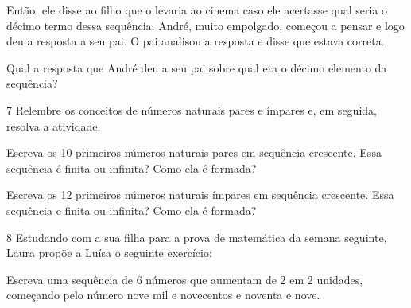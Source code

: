 Então, ele disse ao filho que o levaria ao cinema caso ele acertasse
qual seria o décimo termo dessa sequência. André, muito empolgado, começou a
pensar e logo deu a resposta a seu pai. O pai analisou a resposta e
disse que estava correta.

Qual a resposta que André deu a seu pai sobre qual era o décimo elemento da sequência?


\num{7} Relembre os conceitos de números naturais pares e ímpares e, em
seguida, resolva a atividade.

\begin{escolha}
\item
  Escreva os 10 primeiros números naturais pares em sequência crescente.
  Essa sequência é finita ou infinita? Como ela é formada?

\item{}

\item
  Escreva os 12 primeiros números naturais ímpares em sequência
  crescente. Essa sequência e finita ou infinita? Como ela é formada?

\item {}
\end{escolha}

\pagebreak
\num{8} Estudando com a sua filha para a prova de matemática da semana
seguinte, Laura propõe a Luísa o seguinte exercício:

\begin{mdframed}[linewidth=2pt,linecolor=salmao,backgroundcolor=salmao!20]
Escreva uma sequência de 6 números que aumentam de 2 em 2 unidades,
começando pelo número nove mil e novecentos e noventa e nove.
\end{mdframed}

